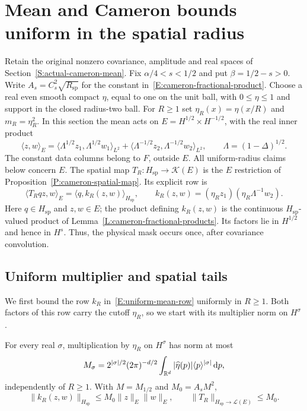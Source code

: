 \section{Mean and Cameron bounds uniform in the spatial radius}
\label{S:uniform-mean-regulation}

Retain the original nonzero covariance, amplitude and real spaces of
Section~\ref{S:actual-cameron-mean}. Fix $\alpha/4 < s < 1/2$ and put $\beta =
1/2-s > 0$. Write $A_s = C_s^2\sqrt{R_{\mathrm{sp}}}$ for the constant
in~\eqref{E:cameron-fractional-product}. Choose a real even smooth compact
$\eta$, equal to one on the unit ball, with $0 \le \eta \le 1$ and support in
the closed radius-two ball. For $R \ge 1$ set $\eta_R(x) = \eta(x/R)$ and $m_R =
\eta_R^2$. In this section the mean acts on $E = H^{1/2}\times H^{-1/2}$,
with the real inner product
\[
  \langle z,w\rangle_E
  =\langle\Lambda^{1/2}z_1,\Lambda^{1/2}w_1\rangle_{L^2}
  +\langle\Lambda^{-1/2}z_2,\Lambda^{-1/2}w_2\rangle_{L^2},
  \qquad \Lambda=(1-\Delta)^{1/2}.
\]
The constant data columns belong to $F$, outside $E$. All uniform-radius claims
below concern $E$. The spatial map $T_R:H_{\mathrm{sp}} \to \mathcal{K}(E)$ is
the $E$ restriction of Proposition~\ref{P:cameron-spatial-map}. Its explicit row
is
\begin{equation}\label{E:uniform-mean-row}
  \langle T_Rqz,w\rangle_E
  =\langle q,k_R(z,w)\rangle_{H_{\mathrm{sp}}},
  \qquad
  k_R(z,w)=(\eta_Rz_1)(\eta_R\Lambda^{-1}w_2).
\end{equation}
Here $q \in H_{\mathrm{sp}}$ and $z,w \in E$; the product defining
$k_R(z,w)$ is the continuous $H_{\mathrm{sp}}$-valued product of
Lemma~\ref{L:cameron-fractional-products}. Its factors lie in $H^{1/2}$
and hence in $H^s$. Thus, the physical mask occurs once, after covariance
convolution.

\subsection{Uniform multiplier and spatial tails}

We first bound the row $k_R$ in~\eqref{E:uniform-mean-row} uniformly in
$R \ge 1$. Both factors of this row carry the cutoff $\eta_R$, so we start with
its multiplier norm on $H^\sigma$.
%
\begin{lemma}\label{L:uniform-mean-cutoff}
  For every real $\sigma$, multiplication by $\eta_R$ on $H^\sigma$ has norm at
  most
  \[
    M_\sigma=2^{|\sigma|/2}(2\pi)^{-d/2}
    \int_{\mathbb{R}^d}|\widehat{\eta}(p)|\langle p\rangle^{|\sigma|}\,\mathrm{d} p,
  \]
  independently of $R \ge 1$. With $M = M_{1/2}$ and $M_0 = A_sM^2$,
  \begin{equation}\label{E:uniform-spatial-mean}
    \|k_R(z,w)\|_{H_{\mathrm{sp}}}
    \le M_0\|z\|_E\|w\|_E,\qquad
    \|T_R\|_{H_{\mathrm{sp}}\to\mathcal{L}(E)}\le M_0 .
  \end{equation}
\end{lemma}

